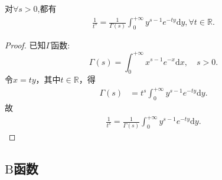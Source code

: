 \documentclass[../../main.tex]{subfiles}%
\begin{document}
\begin{proposition}\label{proposition:分式化积分-Gamma函数相关性质}
对$\forall s>0$,都有
\begin{align}\label{euqation:将分式化成积分形式}
\frac{1}{t^s}=\frac{1}{\Gamma \left( s \right)}\int_0^{+\infty}{y^{s-1}e^{-ty}\mathrm{d}y},\forall t\in \mathbb{R}.
\end{align}
\end{proposition}
\begin{proof}

已知$\Gamma $函数:\[\Gamma \left( s \right) =\int_0^{+\infty}{x^{s-1}e^{-x}\mathrm{d}x},\quad s>0.\]
令$x=ty$，其中$t\in \mathbb{R}$，得
\begin{align*}
\Gamma \left( s \right) &= t^s\int_0^{+\infty}{y^{s-1}e^{-ty}\mathrm{d}y} .
\end{align*}
故
\begin{align*}
\frac{1}{t^s}=\frac{1}{\Gamma \left( s \right)}\int_0^{+\infty}{y^{s-1}e^{-ty}\mathrm{d}y}.
\end{align*}

\end{proof}


\subsection{$\mathrm{B}$函数}
\end{document}
